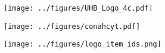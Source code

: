 	\begin{frame}
		\titlepage %
		\vfill %
		\begin{figure}[h]
			\begin{minipage}[b]{0.32\linewidth}
				\texttt{[image: ../figures/UHB\_Logo\_4c.pdf]} %
			\end{minipage}
			\hfill
			\begin{minipage}[b]{0.32\linewidth}
				\texttt{[image: ../figures/conahcyt.pdf]} %
			\end{minipage}
			\hfill
			\begin{minipage}[b]{0.32\linewidth}
				\texttt{[image: ../figures/logo\_item\_ids.png]} %
			\end{minipage}
		\end{figure}
	\end{frame}